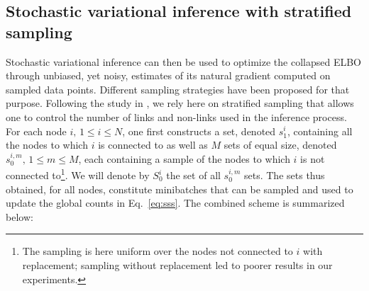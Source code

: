 \subsection{Stochastic variational inference with stratified sampling}

Stochastic variational inference can then be used to optimize the collapsed ELBO through unbiased, yet noisy, estimates of its natural gradient computed on sampled data points. Different sampling strategies \cite{gopalan2013efficient,kim2013efficient} have been proposed for that purpose. Following the study in \cite{gopalan2013efficient}, we rely here on stratified sampling that allows one to control the number of links and non-links used in the inference process. For each node $i, \, 1 \le i \le N$, one first constructs a set, denoted $s_1^i$, containing all the nodes to which $i$ is connected to as well as $M$ sets of equal size, denoted $s_0^{i,m}, \, 1 \le m \le M$, each containing a sample of the nodes to which $i$ is not connected to\footnote{The sampling is here uniform over the nodes not connected to $i$ with replacement; sampling without replacement led to poorer results in our experiments.}. We will denote by $S_0^i$ the set of all $s_0^{i,m}$ sets. The sets thus obtained, for all nodes, constitute minibatches that can be sampled and used to update the global counts in Eq.~\ref{eq:sss}. The combined scheme is summarized below:
%
